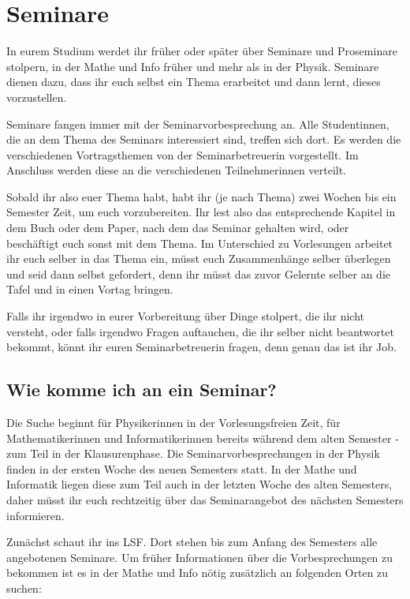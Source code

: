 \section{Seminare}

In eurem Studium werdet ihr früher oder später über Seminare und Proseminare stolpern, in der Mathe und Info früher und mehr als in der Physik. Seminare dienen dazu, dass ihr euch selbst ein Thema erarbeitet und dann lernt, dieses vorzustellen.

Seminare fangen immer mit der Seminarvorbesprechung an. Alle Studentinnen, die an dem Thema des Seminars interessiert sind, treffen sich dort. Es werden die verschiedenen Vortragsthemen von der Seminarbetreuerin vorgestellt. Im Anschluss werden diese an die verschiedenen Teilnehmerinnen verteilt.

Sobald ihr also euer Thema habt, habt ihr (je nach Thema) zwei Wochen bis ein Semester Zeit, um euch vorzubereiten. Ihr lest also das entsprechende Kapitel in dem Buch oder dem Paper, nach dem das Seminar gehalten wird, oder beschäftigt euch sonst mit dem Thema. Im Unterschied zu Vorlesungen arbeitet ihr euch selber in das Thema ein, müsst euch Zusammenhänge selber überlegen und seid dann selbst gefordert, denn ihr müsst das zuvor Gelernte selber an die Tafel und in einen Vortag bringen.

Falls ihr irgendwo in eurer Vorbereitung über Dinge stolpert, die ihr nicht versteht, oder falls irgendwo Fragen auftauchen, die ihr selber nicht beantwortet bekommt, könnt ihr euren Seminarbetreuerin fragen, denn genau das ist ihr Job.

\subsection{Wie komme ich an ein Seminar?}

Die Suche beginnt für Physikerinnen in der Vorlesungsfreien Zeit, für Mathematikerinnen und Informatikerinnen bereits während dem alten Semester \-- zum Teil in der Klausurenphase. Die Seminarvorbesprechungen in der Physik finden in der ersten Woche des neuen Semesters statt. In der Mathe und Informatik liegen diese zum Teil auch in der letzten Woche des alten Semesters, daher müsst ihr euch rechtzeitig über das Seminarangebot des nächsten Semesters informieren.

Zunächst schaut ihr ins LSF. Dort stehen bis zum Anfang des Semesters alle angebotenen Seminare. Um früher Informationen über die Vorbesprechungen zu bekommen ist es in der Mathe und Info nötig zusätzlich an folgenden Orten zu suchen:

